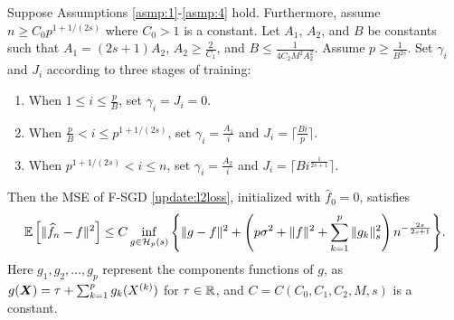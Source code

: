 \begin{theorem}\label{theorem:l2loss}
Suppose Assumptions \ref{asmp:1}-\ref{asmp:4} hold. Furthermore, assume $n \geq C_0 p^{1+1/(2s)}$ where $C_0 > 1$ is a constant. Let $A_1$, $ A_2 $, and $ B$ be constants such that $A_1 = (2s+1)A_2 $, $ A_2 \geq \frac{2}{C_1}$, and $B \leq \frac{1}{4C_2M^2A_2^2}$. Assume $p \geq \frac{1}{B^{2s}}$.
Set $\gamma_i$ and $J_i$ according to three stages of training:
\begin{enumerate}
    \item[i] When $1\leq i\leq \frac{p}{B}$, set $\gamma_i = J_i = 0$.
    \item[ii] When $\frac{p}{B} < i\leq p^{1+1/(2s)}$, set $\gamma_i = \frac{A_1}{i}$ and $J_i = \lceil \frac{Bi}{p}\rceil$.
    \item[iii] When $p^{1+1/(2s)} < i \leq n$, set $\gamma_i = \frac{A_2}{i}$ and $J_i = \lceil Bi^{\frac{1}{2s+1}}\rceil$.
\end{enumerate}
Then the MSE of F-SGD \eqref{update:l2loss}, initialized with $\hat f_0 = 0$, satisfies
\begin{align}\label{thm_ineq1}
    \mathbb{E} \left[\| \widehat{f}_n - f\|^2 \right] \leq C\inf_{g\in \mathcal{H}_p(s)} \Bigg\{ \|g-f\|^2 + \left(p\sigma^2+\|f\|^2+\sum_{k=1}^p\|g_k\|^2_s \right) n^{-\frac{2s}{2s+1}}\Bigg\}.
\end{align}
Here $g_1,g_2,\dots,g_p$ represent the components functions of $g$, as $g(\bm{X}) = \tau + \sum_{k=1}^pg_k(X^{(k)})$  for $\tau \in \mathbb{R}$, and  $C = C(C_0,C_1,C_2,M,s)$ is a constant. 
\end{theorem}

